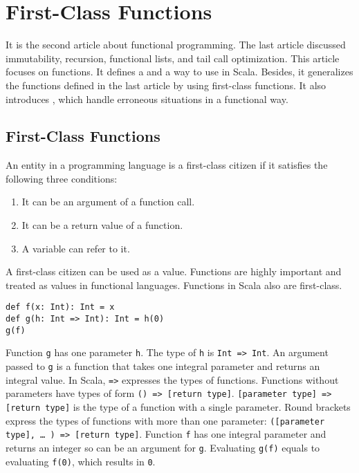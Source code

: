 \setchapterpreamble[u]{\margintoc}
\chapter{First-Class Functions}

It is the second article about functional programming. The last article discussed
immutability, recursion, functional lists, and tail call optimization. This
article focuses on functions. It defines a  and a way
to use  in Scala. Besides, it generalizes the functions
defined in the last article by using first-class functions. It also introduces
, which handle erroneous situations in a functional way.

\section{First-Class Functions}

An entity in a programming language is a first-class citizen if it satisfies the
following three conditions:

\begin{enumerate}
\item It can be an argument of a function call.
\item It can be a return value of a function.
\item A variable can refer to it.
\end{enumerate}

A first-class citizen can be used as a value. Functions are highly important and
treated as values in functional languages. Functions in Scala also are
first-class.

\begin{verbatim}
def f(x: Int): Int = x
def g(h: Int => Int): Int = h(0)
g(f)
\end{verbatim}

Function \verb!g! has one parameter \verb!h!. The type of \verb!h! is \verb!Int => Int!.
An argument passed to \verb!g! is a function that takes one integral
parameter and returns an integral value. In Scala, \verb!=>! expresses the types
of functions. Functions without parameters have types of form \verb!() => [return type]!.
\verb![parameter type] => [return type]! is the type of a function with a
single parameter. Round brackets express the types of functions with more than
one parameter: \verb!([parameter type], … ) => [return type]!. Function \verb!f!
has one integral parameter and returns an integer so can be an argument for
\verb!g!. Evaluating \verb!g(f)! equals to evaluating \verb!f(0)!, which results
in \verb!0!.

